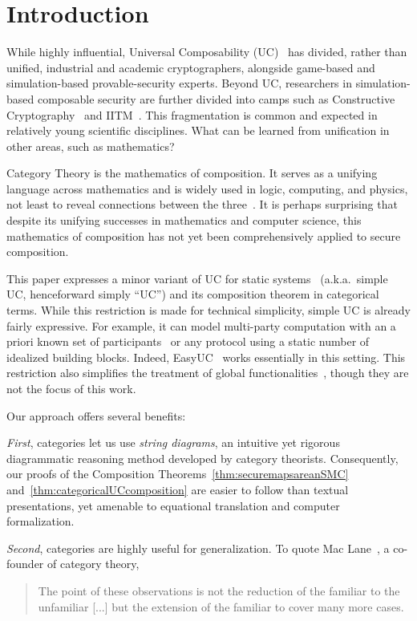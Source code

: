 \section{Introduction}
\label{sec:intro}

While highly influential, Universal Composability (UC)~\cite{Can01,Can20} has divided, rather than unified, industrial and academic cryptographers, alongside game-based and simulation-based provable-security experts. Beyond UC, researchers in simulation-based composable security are further divided into camps such as Constructive Cryptography~\cite{Mau11} and IITM~\cite{DBLP:conf/csfw/Kusters06}. This fragmentation is common and expected in relatively young scientific disciplines. What can be learned from unification in other areas, such as mathematics?

Category Theory is the mathematics of composition. It serves as a unifying language across mathematics and is widely used in logic, computing, and physics, not least to reveal connections between the three~\cite{baez_physics_2011}.
It is perhaps surprising that despite its unifying successes in mathematics and computer science, this mathematics of composition has not yet been comprehensively applied to secure composition.

This paper expresses a minor variant of UC for static systems~\cite[Section 2]{Can20} (a.k.a.\ simple UC, henceforward simply ``UC'') and its composition theorem in categorical terms. While this restriction is made for technical simplicity, simple UC is already fairly expressive. For example, it can model multi-party computation with an a priori known set of participants~\cite{DBLP:conf/crypto/CanettiCL15} or any protocol using a static number of idealized building blocks. 
Indeed, EasyUC~\cite{CSV19:EasyUC} works essentially in this setting.
This restriction also simplifies the treatment of global functionalities~\cite{BCH+:globalwithUC}, though they are not the focus of this work.

Our approach offers several benefits:

\emph{First}, categories let us use \emph{string diagrams}, an intuitive yet rigorous diagrammatic reasoning method developed by category theorists. Consequently, our proofs of the Composition Theorems~\ref{thm:securemapsareanSMC} and~\ref{thm:categoricalUCcomposition} are easier to follow than textual presentations, yet amenable to equational translation and computer formalization. 

\emph{Second}, categories are highly useful for generalization. To quote Mac Lane~\cite[IX.6]{maclane:categories}, a co-founder of category theory,  
\begin{quote}
    The point of these observations is not the reduction of the familiar to the unfamiliar [...] but the extension of the familiar to cover many more cases.
\end{quote}

